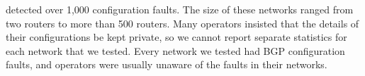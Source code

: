 \rcc detected over
1,000 configuration faults.  The size of these networks ranged from two
routers to more than 500 routers. 
Many operators insisted that the details of their configurations be kept
private, so we cannot report separate statistics for each network that
we tested.  Every network we tested had BGP configuration
faults, and operators were
usually unaware of the faults in their networks.











